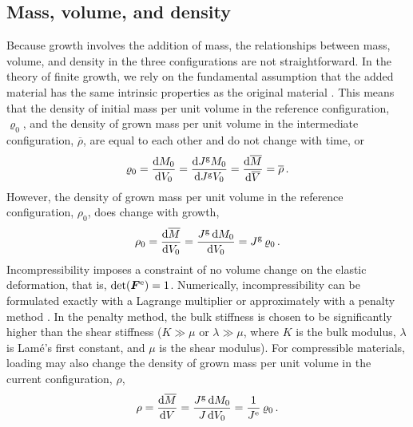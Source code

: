 \documentclass[10pt,letterpaper,oneside]{report}
\newcommand{\sca}[1]{\mbox{\rm{#1}}{}} %
\newcommand{\ten}[1]{\mbox{\boldmath $#1$}{}}
\newcommand{\scas}[1]{\mbox{{\scriptsize{${\rm{#1}}$}}}{}}
\begin{document}
\subsection{Mass, volume, and density}
Because growth involves the addition of mass, the relationships between mass, volume, and density in the three configurations are not straightforward.  In the theory of finite growth, we rely on the fundamental assumption that the added material has the same intrinsic properties as the original material \autocite{Rodriguez1994}.  This means that 
the density of initial mass per unit volume in the reference configuration, $\varrho_0$, and
the density of grown mass per unit volume in the intermediate configuration, $\overline{\rho}$,
are equal to each other and do not change with time, or  
\begin{equation}
\varrho_0 = \frac{\sca{d} M_0}{\sca{d} V_0} = \frac{\sca{d} J^{\scas{g}} M_0}{\sca{d} J^{\scas{g}} V_0} = \frac{\sca{d} \overline{M}}{\sca{d} \overline{V}} = \overline{\rho} \, .
\end{equation}
However, the density of grown mass per unit volume in the reference configuration, $\rho_0$, does change with growth,
\begin{equation}
\rho_0 = \frac{ \sca{d} \overline{M} }{ \sca{d} V_0 } = \frac{ J^{\scas{g}} \, \sca{d} M_0 }{ \sca{d} V_0 } = J^{\scas{g}} \, \varrho_0 \, .
\end{equation}
Incompressibility imposes a constraint of no volume change on the elastic deformation, that is, $\det (\ten{F}^{\scas{e}}) = 1$.  Numerically, incompressibility can be formulated exactly with a Lagrange multiplier or approximately with a penalty method \autocite{Hughes}.  In the penalty method, the bulk stiffness is chosen to be significantly higher than the shear stiffness ($K \gg \mu$ or $\lambda \gg \mu$, where $K$ is the bulk modulus, $\lambda$ is Lam\'{e}'s first constant, and $\mu$ is the shear modulus).  
For compressible materials, loading may also change the density of grown mass per unit volume in the current configuration, $\rho$,
\begin{equation}
\rho = \frac{ \sca{d} \overline{M} }{ \sca{d} V } = \frac{ J^{\scas{g}} \, \sca{d} M_0 }{ J \, \sca{d} V_0 } = \frac{1}{J^{\scas{e}}} \, \varrho_0 \, .
\end{equation}
\end{document}
